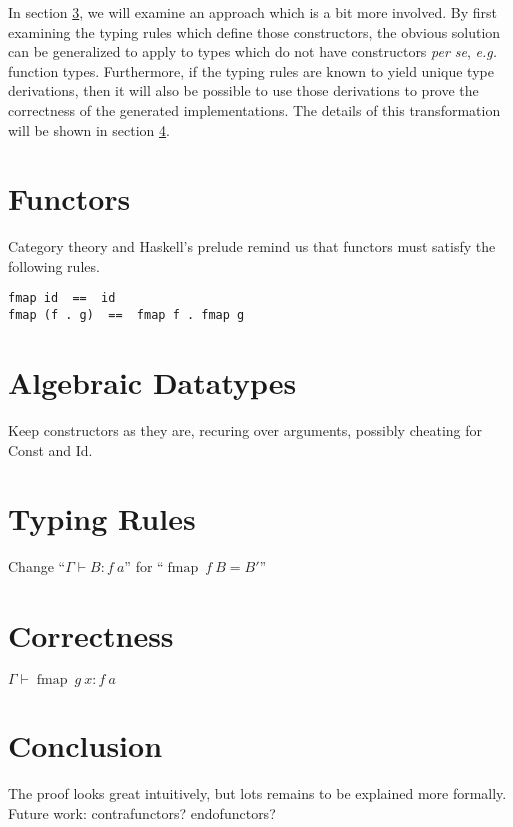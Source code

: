 \documentclass{article}
\newcommand{\entail}{\vdash}
\newcommand{\fmap}{\mathop{\mathrm{fmap}}}
\begin{document}
\begin{multicols}{2}
In section \ref{complicated}, we will examine an approach which is a bit more involved. By first examining the typing rules which define those constructors, the obvious solution can be generalized to apply to types which do not have constructors \emph{per se}, \emph{e.g.} function types. Furthermore, if the typing rules are known to yield unique type derivations, then it will also be possible to use those derivations to prove the correctness of the generated implementations. The details of this transformation will be shown in section \ref{proof}.

\section{Functors}\label{functor}
Category theory and Haskell's prelude remind us that functors must satisfy the following rules.
\begin{verbatim}
fmap id  ==  id
fmap (f . g)  ==  fmap f . fmap g
\end{verbatim}

\section{Algebraic Datatypes}\label{simple}
Keep constructors as they are, recuring over arguments, possibly cheating for Const and Id.

\section{Typing Rules}\label{complicated}
Change ``$\Gamma \entail B : f~a$'' for ``$\fmap~f~B = B'$''

\section{Correctness}\label{proof}
$\Gamma \entail \fmap~g~x : f~a$

\section{Conclusion}\label{conclusion}
The proof looks great intuitively, but lots remains to be explained more formally. Future work: contrafunctors? endofunctors?
\end{multicols}
\end{document}
